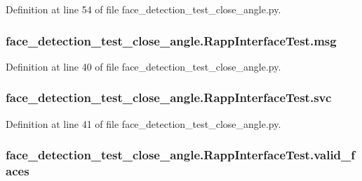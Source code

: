 Definition at line 54 of file face\-\_\-detection\-\_\-test\-\_\-close\-\_\-angle.\-py.

\hypertarget{classface__detection__test__close__angle_1_1RappInterfaceTest_afe2472e495c74496cb7ad9b640a70fd5}{
\subsubsection[{msg}]{\setlength{\rightskip}{0pt plus 5cm}face\-\_\-detection\-\_\-test\-\_\-close\-\_\-angle.\-Rapp\-Interface\-Test.\-msg}}\label{classface__detection__test__close__angle_1_1RappInterfaceTest_afe2472e495c74496cb7ad9b640a70fd5}


Definition at line 40 of file face\-\_\-detection\-\_\-test\-\_\-close\-\_\-angle.\-py.

\hypertarget{classface__detection__test__close__angle_1_1RappInterfaceTest_a9b7f4440d9c6b512cb4029aac6ba8de7}{
\subsubsection[{svc}]{\setlength{\rightskip}{0pt plus 5cm}face\-\_\-detection\-\_\-test\-\_\-close\-\_\-angle.\-Rapp\-Interface\-Test.\-svc}}\label{classface__detection__test__close__angle_1_1RappInterfaceTest_a9b7f4440d9c6b512cb4029aac6ba8de7}


Definition at line 41 of file face\-\_\-detection\-\_\-test\-\_\-close\-\_\-angle.\-py.

\hypertarget{classface__detection__test__close__angle_1_1RappInterfaceTest_af862bf3dc27ad26cc3a8683d1ad00173}{
\subsubsection[{valid\-\_\-faces}]{\setlength{\rightskip}{0pt plus 5cm}face\-\_\-detection\-\_\-test\-\_\-close\-\_\-angle.\-Rapp\-Interface\-Test.\-valid\-\_\-faces}}\label{classface__detection__test__close__angle_1_1RappInterfaceTest_af862bf3dc27ad26cc3a8683d1ad00173}



